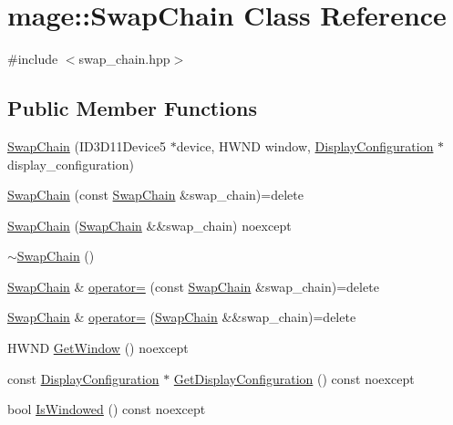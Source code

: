 \hypertarget{classmage_1_1_swap_chain}{}\section{mage\+:\+:Swap\+Chain Class Reference}
\label{classmage_1_1_swap_chain}


{\ttfamily \#include $<$swap\+\_\+chain.\+hpp$>$}

\subsection*{Public Member Functions}
\begin{DoxyCompactItemize}
\item 
\hyperlink{classmage_1_1_swap_chain_a81bde3f34bbcd36e4e1dd053a2c0f736}{Swap\+Chain} (I\+D3\+D11\+Device5 $\ast$device, H\+W\+ND window, \hyperlink{classmage_1_1_display_configuration}{Display\+Configuration} $\ast$display\+\_\+configuration)
\item 
\hyperlink{classmage_1_1_swap_chain_a85d5da233182a273705b4fa1c419a0aa}{Swap\+Chain} (const \hyperlink{classmage_1_1_swap_chain}{Swap\+Chain} \&swap\+\_\+chain)=delete
\item 
\hyperlink{classmage_1_1_swap_chain_ae1ca2e30957b83e89be5793ea6da76dd}{Swap\+Chain} (\hyperlink{classmage_1_1_swap_chain}{Swap\+Chain} \&\&swap\+\_\+chain) noexcept
\item 
\hyperlink{classmage_1_1_swap_chain_a853168cba69cadc3d8c10ad2f4939e72}{$\sim$\+Swap\+Chain} ()
\item 
\hyperlink{classmage_1_1_swap_chain}{Swap\+Chain} \& \hyperlink{classmage_1_1_swap_chain_a8ea6de219f37d447487d7d3b4bbd5867}{operator=} (const \hyperlink{classmage_1_1_swap_chain}{Swap\+Chain} \&swap\+\_\+chain)=delete
\item 
\hyperlink{classmage_1_1_swap_chain}{Swap\+Chain} \& \hyperlink{classmage_1_1_swap_chain_a4335d4e0869c43a66bfce5f2d0d6f34c}{operator=} (\hyperlink{classmage_1_1_swap_chain}{Swap\+Chain} \&\&swap\+\_\+chain)=delete
\item 
H\+W\+ND \hyperlink{classmage_1_1_swap_chain_a4e7e21747db8638646b46690a23ea76f}{Get\+Window} () noexcept
\item 
const \hyperlink{classmage_1_1_display_configuration}{Display\+Configuration} $\ast$ \hyperlink{classmage_1_1_swap_chain_afb7cf408081f09d0241f3e764a047e74}{Get\+Display\+Configuration} () const noexcept
\item 
bool \hyperlink{classmage_1_1_swap_chain_a7cf71ec46d0af888b9b1daa890a54d39}{Is\+Windowed} () const noexcept

\end{DoxyCompactItemize}
